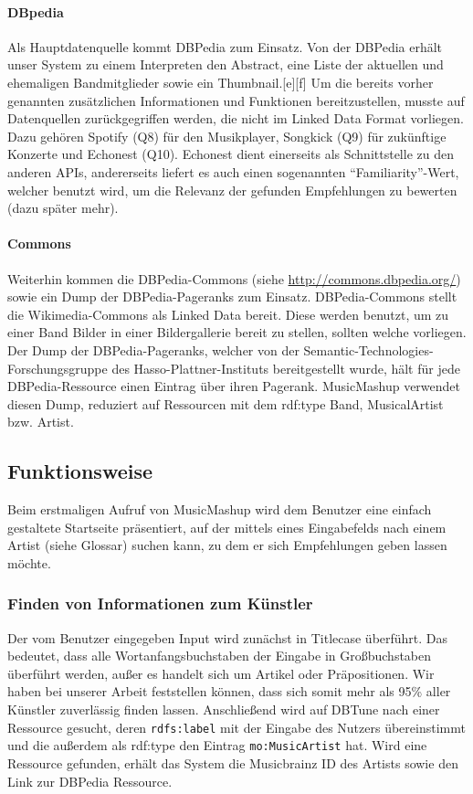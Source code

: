 \paragraph{DBpedia} Als Hauptdatenquelle kommt DBPedia zum Einsatz. Von der DBPedia erhält unser System zu einem Interpreten den Abstract, eine Liste der aktuellen und ehemaligen Bandmitglieder sowie ein Thumbnail.[e][f]
Um die bereits vorher genannten zusätzlichen Informationen und Funktionen bereitzustellen, musste auf Datenquellen zurückgegriffen werden, die nicht im Linked Data Format vorliegen. Dazu gehören Spotify (Q8) für den Musikplayer, Songkick (Q9) für zukünftige Konzerte und Echonest (Q10). Echonest dient einerseits als Schnittstelle zu den anderen APIs, andererseits liefert es auch einen sogenannten “Familiarity”-Wert, welcher benutzt wird, um die Relevanz der gefunden Empfehlungen zu bewerten (dazu später mehr).

\paragraph{Commons} Weiterhin kommen die DBPedia-Commons (siehe \url{http://commons.dbpedia.org/}) sowie ein Dump der DBPedia-Pageranks zum Einsatz. DBPedia-Commons stellt die Wikimedia-Commons als Linked Data bereit. Diese werden benutzt, um zu einer Band Bilder in einer Bildergallerie bereit zu stellen, sollten welche vorliegen. 
Der Dump der DBPedia-Pageranks, welcher von der Semantic-Technologies-Forschungsgruppe des Hasso-Plattner-Instituts bereitgestellt wurde, hält für jede DBPedia-Ressource einen Eintrag über ihren Pagerank. MusicMashup verwendet diesen Dump, reduziert auf Ressourcen mit dem rdf:type Band, MusicalArtist bzw. Artist.

\subsection{Funktionsweise}


Beim erstmaligen Aufruf von MusicMashup wird dem Benutzer eine einfach gestaltete Startseite präsentiert, auf der mittels eines Eingabefelds nach einem Artist (siehe Glossar) suchen kann, zu dem er sich Empfehlungen geben lassen möchte.



\subsubsection{Finden von Informationen zum Künstler}
Der vom Benutzer eingegeben Input wird zunächst in Titlecase überführt. Das bedeutet, dass alle Wortanfangsbuchstaben der Eingabe in Großbuchstaben überführt werden, außer es handelt sich um Artikel oder Präpositionen. Wir haben bei unserer Arbeit feststellen können, dass sich somit mehr als 95\% aller Künstler zuverlässig finden lassen.
Anschließend wird auf DBTune nach einer Ressource gesucht, deren \texttt{rdfs:label} mit der Eingabe des Nutzers übereinstimmt und die außerdem als rdf:type den Eintrag \texttt{mo:MusicArtist} hat. Wird eine Ressource gefunden, erhält das System die Musicbrainz ID des Artists sowie den Link zur DBPedia Ressource.

